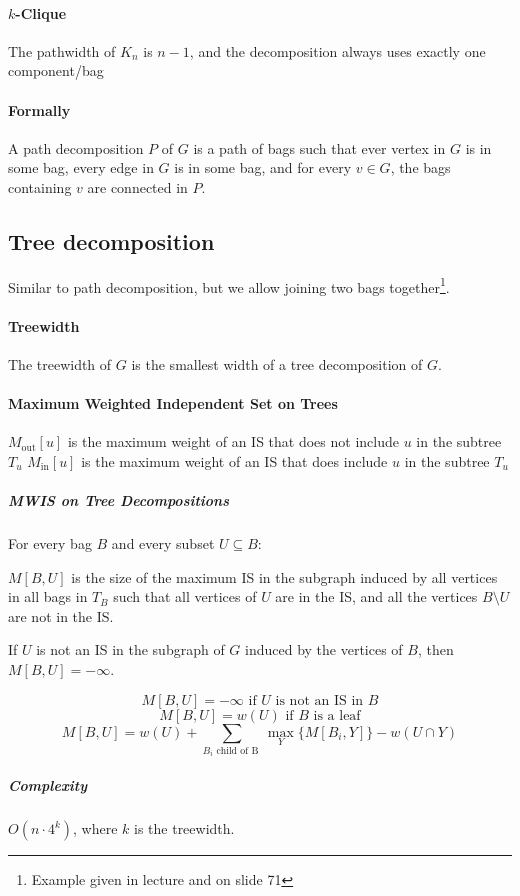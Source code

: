\documentclass[a4paper]{article}
\begin{document}
\paragraph{$k$-Clique}
The pathwidth of $K_n$ is $n-1$, and the decomposition always uses exactly one component/bag

\paragraph{Formally}
A path decomposition $P$ of $G$ is a path of bags such that ever vertex in $G$ is in some bag, every edge in $G$ is in some bag, and for every $v\in G$, the bags containing $v$ are connected in $P$.

\subsection{Tree decomposition}
Similar to path decomposition, but we allow joining two bags together\footnote{Example given in lecture and on slide 71}.

\paragraph{Treewidth}
The treewidth of $G$ is the smallest width of a tree decomposition of $G$.

\paragraph{Maximum Weighted Independent Set on Trees}

$M_{\text{out}}[u]$ is the maximum weight of an IS that does not include $u$ in the subtree $T_u$
$M_{\text{in}}[u]$ is the maximum weight of an IS that does include $u$ in the subtree $T_u$

\subparagraph{MWIS on Tree Decompositions}
For every bag $B$ and every subset $U\subseteq B$:

$M[B, U]$ is the size of the maximum IS in the subgraph induced by all vertices in all bags in $T_B$ such that all vertices of $U$ are in the IS, and all the vertices $B\setminus U$ are not in the IS.


If $U$ is not an IS in the subgraph of $G$ induced by the vertices of $B$, then $M[B,U]=-\infty$.

\[M[B, U] = -\infty \text{ if $U$ is not an IS in $B$}\]
\[M[B, U] = w(U) \text{ if $B$ is a leaf}\]
\[M[B, U] = w(U) + \sum\limits_{B_i\text{ child of B }} \max\limits_Y \{M[B_i,Y]\} - w(U \cap Y)\]

\subparagraph{Complexity}
$O(n\cdot 4^k)$, where $k$ is the treewidth.
\end{document}
